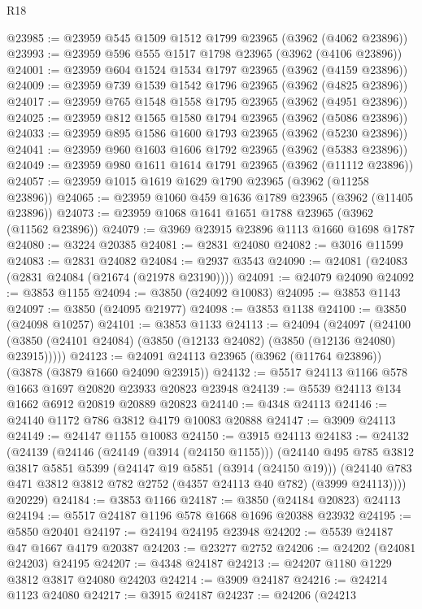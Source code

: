\begin{lexlean}{R18}
\begin{coremodule}
@23985 := @23959 @545 @1509 @1512 @1799 @23965 (@3962 (@4062 @23896))
@23993 := @23959 @596 @555 @1517 @1798 @23965 (@3962 (@4106 @23896))
@24001 := @23959 @604 @1524 @1534 @1797 @23965 (@3962 (@4159 @23896))
@24009 := @23959 @739 @1539 @1542 @1796 @23965 (@3962 (@4825 @23896))
@24017 := @23959 @765 @1548 @1558 @1795 @23965 (@3962 (@4951 @23896))
@24025 := @23959 @812 @1565 @1580 @1794 @23965 (@3962 (@5086 @23896))
@24033 := @23959 @895 @1586 @1600 @1793 @23965 (@3962 (@5230 @23896))
@24041 := @23959 @960 @1603 @1606 @1792 @23965 (@3962 (@5383 @23896))
@24049 := @23959 @980 @1611 @1614 @1791 @23965 (@3962 (@11112 @23896))
@24057 := @23959 @1015 @1619 @1629 @1790 @23965 (@3962 (@11258 @23896))
@24065 := @23959 @1060 @459 @1636 @1789 @23965 (@3962 (@11405 @23896))
@24073 := @23959 @1068 @1641 @1651 @1788 @23965 (@3962 (@11562 @23896))
@24079 := @3969 @23915 @23896 @1113 @1660 @1698 @1787
@24080 := @3224 @20385
@24081 := @2831 @24080
@24082 := @3016 @11599
@24083 := @2831 @24082
@24084 := @2937 @3543
@24090 := @24081 (@24083 (@2831 @24084 (@21674 (@21978 @23190))))
@24091 := @24079 @24090
@24092 := @3853 @1155
@24094 := @3850 (@24092 @10083)
@24095 := @3853 @1143
@24097 := @3850 (@24095 @21977)
@24098 := @3853 @1138
@24100 := @3850 (@24098 @10257)
@24101 := @3853 @1133
@24113 := @24094
    (@24097 (@24100 (@3850 (@24101 @24084) (@3850 (@12133 @24082) (@3850 (@12136 @24080) @23915)))))
@24123 := @24091 @24113 @23965 (@3962 (@11764 @23896)) (@3878 (@3879 @1660 @24090 @23915))
@24132 := @5517 @24113 @1166 @578 @1663 @1697 @20820 @23933 @20823 @23948
@24139 := @5539 @24113 @134 @1662 @6912 @20819 @20889 @20823
@24140 := @4348 @24113
@24146 := @24140 @1172 @786 @3812 @4179 @10083 @20888
@24147 := @3909 @24113
@24149 := @24147 @1155 @10083
@24150 := @3915 @24113
@24183 := @24132
    (@24139
      (@24146
        (@24149 (@3914 (@24150 @1155)))
        (@24140
          @495
          @785
          @3812
          @3817
          @5851
          @5399
          (@24147 @19 @5851 (@3914 (@24150 @19)))
          (@24140 @783 @471 @3812 @3812 @782 @2752 (@4357 @24113 @40 @782) (@3999 @24113))))
      @20229)
@24184 := @3853 @1166
@24187 := @3850 (@24184 @20823) @24113
@24194 := @5517 @24187 @1196 @578 @1668 @1696 @20388 @23932
@24195 := @5850 @20401
@24197 := @24194 @24195 @23948
@24202 := @5539 @24187 @47 @1667 @4179 @20387
@24203 := @23277 @2752
@24206 := @24202 (@24081 @24203) @24195
@24207 := @4348 @24187
@24213 := @24207 @1180 @1229 @3812 @3817 @24080 @24203
@24214 := @3909 @24187
@24216 := @24214 @1123 @24080
@24217 := @3915 @24187
@24237 := @24206
    (@24213

\end{coremodule}
\end{lexlean}
